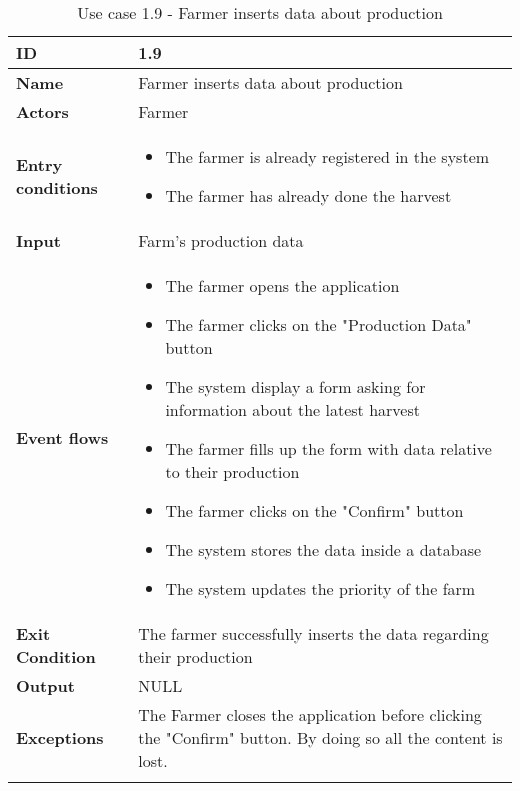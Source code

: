 \begin{longtable}[H]{ | l | p{10cm} | }
\hline
{\cellcolor[rgb]{0.753,0.753,0.753}}\textbf{ID}  & 1.9 \\ \hline
{\cellcolor[rgb]{0.753,0.753,0.753}}\textbf{Name} & Farmer inserts data about production \\ \hline
{\cellcolor[rgb]{0.753,0.753,0.753}}\textbf{Actors} & Farmer \\ \hline
{\cellcolor[rgb]{0.753,0.753,0.753}}\textbf{Entry conditions} &
\begin{itemize}
    \item The farmer is already registered in the system
    \item The farmer has already done the harvest
\end{itemize}
\\ \hline
{\cellcolor[rgb]{0.753,0.753,0.753}}\textbf{Input} & Farm's production data\\ \hline
{\cellcolor[rgb]{0.753,0.753,0.753}}\textbf{Event flows} &
\begin{itemize}
    \item The farmer opens the application
    \item The farmer clicks on the "Production Data" button
    \item The system display a form asking for information about the latest harvest 
    \item The farmer fills up the form with data relative to their production
    \item The farmer clicks on the "Confirm" button
    \item The system stores the data inside a database
    \item The system updates the priority of the farm
\end{itemize}
\\ \hline
{\cellcolor[rgb]{0.753,0.753,0.753}}\textbf{Exit Condition} & The farmer successfully inserts the data regarding their production\\ \hline
{\cellcolor[rgb]{0.753,0.753,0.753}}\textbf{Output} & NULL
\\ \hline
{\cellcolor[rgb]{0.753,0.753,0.753}}\textbf{Exceptions} & The Farmer closes the application before clicking the "Confirm" button. By doing so all the content is lost.
\\ \hline
\caption{Use case 1.9 - Farmer inserts data about production}
\\
\end{longtable}